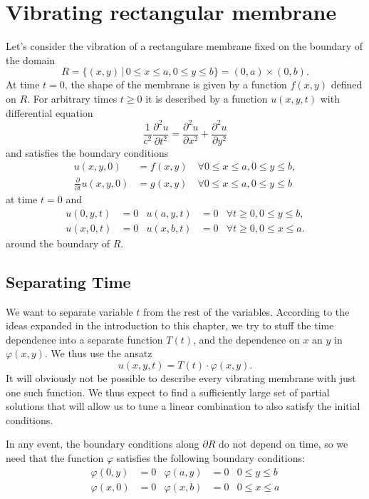%
%
%
\section{Vibrating rectangular membrane}
Let's consider the vibration of a rectangulare membrane fixed on
the boundary of the domain
\[
R=\{(x,y)\,|\,0\le x\le a,0\le y\le b\} =(0,a)\times(0,b).
\]
At time $t=0$, the shape of the membrane is given by a function
$f(x,y)$ defined on $R$.
For arbitrary times $t\ge 0$ it is described by a function $u(x,y,t)$ 
with differential equation
\[
\frac1{c^2}\frac{\partial^2u}{\partial t^2}=\frac{\partial^2u}{\partial x^2}+\frac{\partial^2u}{\partial y^2}
\]
and satisfies the boundary conditions
\begin{align*}
u(x,y,0)&=f(x,y)\quad\forall 0\le x\le a,0\le y\le b,
\\
\frac{\partial}{\partial t}u(x,y,0)&=g(x,y)\quad\forall 0\le x\le a,0\le y\le b
\end{align*}
at time $t=0$ and
\begin{align*}
u(0,y,t)&=0&u(a,y,t)&=0&\forall t\ge 0,0\le y\le b,\\
u(x,0,t)&=0&u(x,b,t)&=0&\forall t\ge 0,0\le x\le a.
\end{align*}
around the boundary of $R$.

\subsection{Separating Time}
We want to separate variable $t$ from the rest of the variables.
According to the ideas expanded in the introduction to this chapter,
we try to stuff the time dependence into a separate function $T(t)$,
and the dependence on $x$ an $y$ in $\varphi(x,y)$.
We thus use the ansatz
\[
u(x,y,t)=T(t)\cdot\varphi(x,y).
\]
It will obviously not be possible to describe every vibrating membrane
with just one such function.
We thus expect to find a sufficiently large set of partial solutions
that will allow us to tune a linear combination to also satisfy the 
initial conditions.


In any event, the boundary conditions along $\partial R$ do not depend
on time, so we need that the function $\varphi$ satisfies the following
boundary conditions:
\begin{align*}
\varphi(0,y)&=0&\varphi(a,y)&=0&0\le y\le b\\
\varphi(x,0)&=0&\varphi(x,b)&=0&0\le x\le a
\end{align*}

